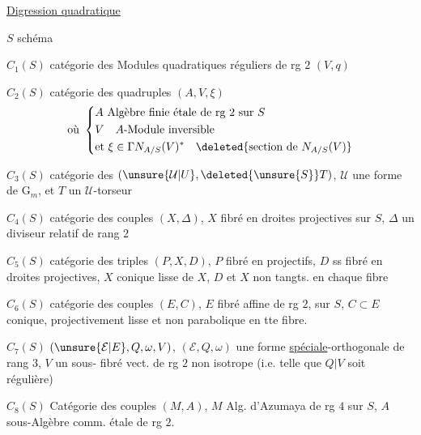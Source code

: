\uline{Digression quadratique}

$S$ schéma

$C_1(S)$ catégorie des Modules quadratiques réguliers de rg $2$ $(V,q)$

$C_2(S)$ catégorie des quadruples $(A,V,\xi)$
\[
\text{où }\left\{\begin{aligned}
&A\text{ Algèbre finie étale de rg }2\text{ sur }S\\
&V\quad A\text{-Module inversible}\\
&\text{et }\xi\in\Gamma N_{A/S}(V)^{*}\quad\deleted{\text{section de }N_{A/S}(V)}
\end{aligned}\right.
\]

$C_3(S)$ catégorie des   $(\unsure{\mathcal U|U},\deleted{\unsure{S}}T)$, $\mathcal U$ une  forme de $\mathrm G_m$, et $T$ un $\mathcal U$-torseur

$C_4(S)$ catégorie des couples $(X,\Delta)$, $X$ fibré en droites projectives sur $S$, $\Delta$ un diviseur relatif  de rang $2$

$C_5(S)$ catégorie des triples $(P,X,D)$, $P$ fibré en  projectifs, $D$  ss fibré en droites projectives, $X$ conique lisse de $X$, $D$ et $X$ non tangts. en chaque fibre


$C_6(S)$ catégorie des couples $(E,C)$, $E$ fibré affine de rg $2$, sur $S$, $C\subset E$ conique, projectivement lisse et  non parabolique en tte fibre.

$C_7(S)$  $(\unsure{\mathcal E|E},Q,\omega,V)$,  $(\mathcal E,Q,\omega)$ une forme \uline{spéciale}-orthogonale de rang $3$, $V$ un sous- fibré vect. de rg $2$  non isotrope (i.e. telle que $Q|V$ soit régulière)

$C_8(S)$ Catégorie des couples $(M,A)$, $M$ Alg. d'Azumaya de rg $4$ sur $S$, $A$ sous-Algèbre comm. étale de rg $2$.
